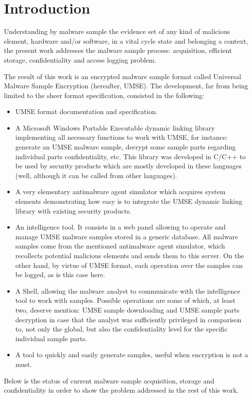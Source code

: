 \newcommand{\package}{\emph}

\chapter{Introduction}

Understanding by malware sample the evidence set of any kind of malicious
element, hardware and/or software, in a vital cycle state and belonging a
context, the present work addresses the malware sample process: acquisition,
efficient storage, confidentiality and access logging problem.

The result of this work is an encrypted malware sample format called Universal
Malware Sample Encryption (hereafter, UMSE). The development, far from being
limited to the sheer format specification, consisted in the following:
\begin{itemize}
\item UMSE format documentation and specification.
\item A Microsoft Windows Portable Executable\cite{MicrosoftPecoff} dynamic linking library\cite{DynamicLinkLibraries}
  implementing all necessary functions to work with UMSE, for instance:
  generate an UMSE malware sample, decrypt some sample parts regarding
  individual parts confidentiality, etc.  This library was developed in C/C++
  to be used by security products which are mostly developed in these
  languages (well, although it can be called from other languages).
\item A very elementary antimalware agent simulator which acquires system
  elements demonstrating how easy is to integrate the UMSE dynamic linking
  library with existing security products.
\item An intelligence tool. It consists in a web panel allowing to operate and
  manage UMSE malware samples stored in a generic database. All malware
  samples come from the mentioned antimalware agent simulator, which
  recollects potential malicious elements and sends them to this server. On
  the other hand, by virtue of UMSE format, each operation over the samples
  can be logged, as is this case here.
\item A Shell, allowing the malware analyst to communicate with the
  intelligence tool to work with samples. Possible operations are some of
  which, at least two, deserve mention: UMSE sample downloading and UMSE
  sample parts decryption in case that the analyst was sufficiently privileged
  in comparison to, not only the global, but also the confidentiality level
  for the specific individual sample parts.
\item A tool to quickly and easily generate samples, useful when encryption is
  not a must.
\end{itemize}
Below is the status of current malware sample acquisition, storage and
confidentiality in order to show the problem addressed in the rest of this
work.

